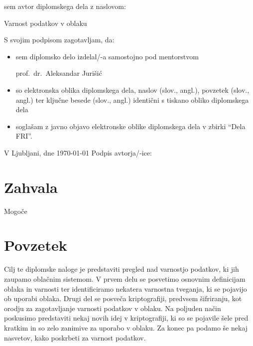 \documentclass[12pt,a4paper,openany,tikz]{book}
\theoremstyle{plain}
\theoremstyle{definition}
\begin{document}
\vspace{1cm}
sem avtor diplomskega dela z naslovom:

\vspace{0.5cm}
\begin{center}
Varnost podatkov v oblaku
\end{center}

\vspace{1.5cm}
S svojim podpisom zagotavljam, da:
\begin{itemize}
	\item sem diplomsko delo izdelal/-a samostojno pod mentorstvom

	prof.\ dr.\ Aleksandar Jurišić

	\item	so elektronska oblika diplomskega dela, naslov (slov., angl.), povzetek (slov., angl.) ter ključne besede (slov., angl.) identični s tiskano obliko diplomskega dela
	\item soglašam z javno objavo elektronske oblike diplomskega dela v zbirki ``Dela FRI''.
\end{itemize}

\vspace{1cm}
V Ljubljani, dne \today \hspace{1cm} Podpis avtorja/-ice:

\cleardoublepage
\chapter*{Zahvala}

Mogoče

\tableofcontents


{\let\cleardoublepage\clearpage
\setcounter{page}{1}
\frontmatter
\glsaddall{}
\printglossary[title=Slovarček]{}
\printglossary[type=\acronymtype,title=Seznam kratic in okrajšav]{}
}



\cleardoublepage
\chapter*{Povzetek}

Cilj te diplomske naloge je predstaviti pregled nad varnostjo podatkov, ki jih zaupamo oblačnim sistemom. V prvem delu se posvetimo osnovnim definicijam oblaka in varnosti ter identificiramo nekatera varnostna tveganja, ki se pojavijo ob uporabi oblaka. Drugi del se posveča kriptografiji, predvsem šifriranju, kot orodju za zagotavljanje varnosti podatkov v oblaku. Na poljuden način poskusimo predstaviti nekaj novih idej v kriptografiji, ki so se pojavile šele pred kratkim in so zelo zanimive za uporabo v oblaku. Za konec pa podamo še nekaj nasvetov, kako poskrbeti za varnost podatkov.
\end{document}
